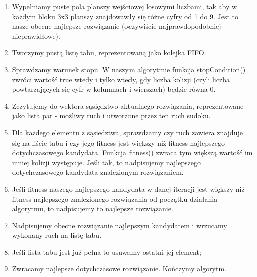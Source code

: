 \documentclass[]{project_report}
\begin{document}
	\begin{enumerate}
		\item Wypełniamy puste pola planszy wejściowej losowymi liczbami, tak aby w każdym bloku 3x3 planszy znajdowawły się różne cyfry od 1 do 9. Jest to nasze obecne najlepsze rozwiązanie (oczywiście najprawdopodobniej nieprawidłowe).
		\item Tworzymy pustą listę tabu, reprezentowaną jako kolejka FIFO.
		\item Sprawdzamy warunek stopu. W naszym algorytmie funkcja stopCondition() zwróci wartość true wtedy i tylko wtedy, gdy liczba kolizji (czyli liczba powtarzających się cyfr w kolumnach i wierszach) będzie równa 0.
		\item Zczytujemy do wektora sąsiędztwo aktualnego rozwiązania, reprezentowane jako lista par - możliwy ruch i utworzone przez ten ruch sudoku.
		\item Dla każdego elementu z sąsiedztwa, sprawdzamy czy ruch zawiera znajduje się na liście tabu i czy jego fitness jest większy niż fitness najlepszego dotychczasowego kandydata. Funkcja fitness() zwraca tym większą wartość im mniej kolizji występuje. Jeśli tak, to nadpisujemy najlepszego dotychczasowego kandydata znalezionym rozwiązaniem.
		\item Jeśli fitness naszego najlepszego kandydata w danej iteracji jest większy niż fitness najlepszego znalezionego rozwiązania od początku działania algorytmu, to nadpisujemy to najlepsze rozwiązanie.
		\item Nadpisujemy obecne rozwiązanie najlepszym kandydatem i wrzucamy wykonany ruch na listę tabu.
		\item Jeśli lista tabu jest już pełna to usuwamy ostatni jej element;
		\item Zwracamy najlepsze dotychczasowe rozwiązanie. Kończymy algorytm.
	\end{enumerate}
\end{document}
